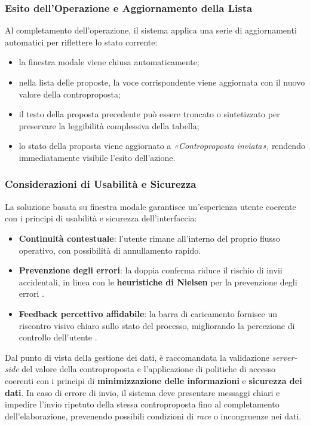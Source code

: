 \subsubsection{Esito dell’Operazione e Aggiornamento della Lista}
Al completamento dell’operazione, il sistema applica una serie di aggiornamenti automatici per riflettere lo stato corrente:
\begin{itemize}
	\item la finestra modale viene chiusa automaticamente;
	\item nella lista delle proposte, la voce corrispondente viene aggiornata con il nuovo valore della controproposta;
	\item il testo della proposta precedente può essere troncato o sintetizzato per preservare la leggibilità complessiva della tabella;
	\item lo stato della proposta viene aggiornato a \emph{«Controproposta inviata»}, rendendo immediatamente visibile l’esito dell’azione.
\end{itemize}

\vspace{0.5cm}
\subsubsection{Considerazioni di Usabilità e Sicurezza}
La soluzione basata su finestra modale garantisce un’esperienza utente coerente con i principi di usabilità e sicurezza dell’interfaccia:
\begin{itemize}
	\item \textbf{Continuità contestuale}: l’utente rimane all’interno del proprio flusso operativo, con possibilità di annullamento rapido.
	\item \textbf{Prevenzione degli errori}: la doppia conferma riduce il rischio di invii accidentali, in linea con le \textbf{heuristiche di Nielsen} per la prevenzione degli errori \cite{nielsen1995}.
	\item \textbf{Feedback percettivo affidabile}: la barra di caricamento fornisce un riscontro visivo chiaro sullo stato del processo, migliorando la percezione di controllo dell’utente \cite{wickens2008}.
\end{itemize}

Dal punto di vista della gestione dei dati, è raccomandata la validazione \textit{server-side} del valore della controproposta e l’applicazione di politiche di accesso coerenti con i principi di \textbf{minimizzazione delle informazioni} e \textbf{sicurezza dei dati}.
In caso di errore di invio, il sistema deve presentare messaggi chiari e impedire l’invio ripetuto della stessa controproposta fino al completamento dell’elaborazione, prevenendo possibili condizioni di \textit{race} o incongruenze nei dati.

